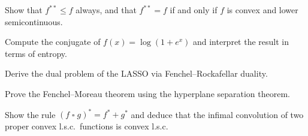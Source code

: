 \begin{exercise}[$\star\star$]
Show that $f^{**} \leq f$ always, and that $f^{**} = f$ if and only if $f$ is convex
and lower semicontinuous.
\end{exercise}

\begin{exercise}[$\star\star$]
Compute the conjugate of $f(x) = \log(1 + e^x)$ and interpret the result in terms
of entropy.
\end{exercise}

\begin{exercise}[$\star\star$]
Derive the dual problem of the LASSO via Fenchel--Rockafellar duality.
\end{exercise}

\begin{exercise}[$\star\star\star$]
Prove the Fenchel--Moreau theorem using the hyperplane separation theorem.
\end{exercise}

\begin{exercise}[$\star\star\star$]
Show the rule $(f \mathop{\square} g)^* = f^* + g^*$ and deduce that the infimal
convolution of two proper convex l.s.c.\ functions is convex l.s.c.
\end{exercise}
